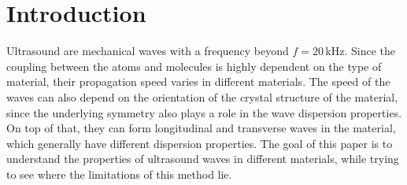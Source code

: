 \documentclass[a4paper,10pt,twocolumn]{article}
\begin{document}
    
    
    
    \section{Introduction}\label{sec:introdction}
    Ultrasound are mechanical waves with a frequency beyond $f = 20\,$kHz.
    Since the coupling between the atoms and molecules is highly dependent on the type of material, their propagation speed varies in different materials.
    The speed of the waves can also depend on the orientation of the crystal structure of the material, since the underlying symmetry also plays a role in the wave dispersion properties.
    On top of that, they can form longitudinal and transverse waves in the material, which generally have different dispersion properties.
    The goal of this paper is to understand the properties of ultrasound waves in different materials, while trying to see where the limitations of this method lie.
    
\end{document}
